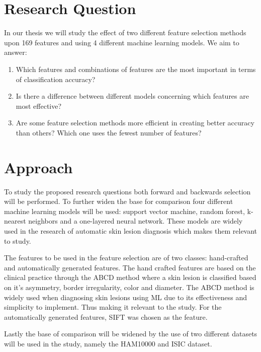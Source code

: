 \documentclass{kththesis}
\begin{document}
\section{Research Question}
In our thesis we will study the effect of two different feature selection methods upon 169 features and using 4 different machine learning models. We aim to answer:
\begin{enumerate}
    \item Which features and combinations of features are the most important in terms of classification accuracy?
    \item Is there a difference between different models concerning which features are most effective?
    \item Are some feature selection methods more efficient in creating better accuracy than others? Which one uses the fewest number of features?
  
\end{enumerate}

\section{Approach}

To study the proposed research questions both forward and backwards selection will be performed. To further widen the base for comparison four different machine learning models will be used: support vector machine, random forest, k-nearest neighbors and a one-layered neural network. These models are widely used in the research of automatic skin lesion diagnosis which makes them relevant to study. %

The features to be used in the feature selection are of two classes: hand-crafted and automatically generated features. The hand crafted features are based on the clinical practice through the ABCD method where a skin lesion is classified based on it’s asymmetry, border irregularity, color and diameter. The ABCD method is widely used when diagnosing skin lesions using ML due to its effectiveness and simplicity to implement. %
Thus making it relevant to the study. For the automatically generated features, SIFT was chosen as the feature. %

Lastly the base of comparison will be widened by the use of two different datasets will be used in the study, namely the HAM10000 and ISIC dataset. 
\end{document}
